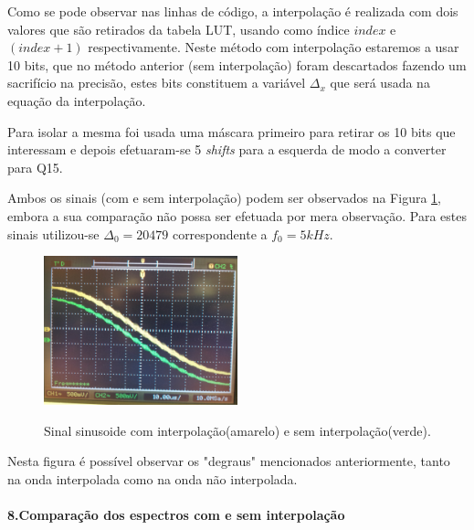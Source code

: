 \documentclass[11pt]{article}
\numberwithin{equation}{section}
\begin{document}
Como se pode observar nas linhas de código, a interpolação é realizada com dois valores que são retirados da tabela LUT, usando como índice $\textit{index}$ \hspace{0,1 mm} e $(\textit{index}+1)$ respectivamente. Neste método com interpolação estaremos a usar 10 bits, que no método anterior (sem interpolação) foram descartados fazendo um sacrifício na precisão,  estes bits constituem a variável $ \Delta_{x} $ que será usada na equação da interpolação.

Para isolar a mesma foi usada uma máscara primeiro para retirar os 10 bits que interessam e depois efetuaram-se 5 \textit{shifts} para a esquerda de modo a converter para Q15.

Ambos os sinais (com e sem interpolação) podem ser observados na Figura \ref{fig:interp}, embora a sua comparação não possa ser efetuada por mera observação. Para estes sinais utilizou-se $\Delta_0=20479$ correspondente a $f_0=5kHz$.
\begin{figure}[H]
	\centering
	\includegraphics[width=0.5\textwidth]{./P1_interp}~\\
	\caption{Sinal sinusoide com interpolação(amarelo) e sem interpolação(verde).}
	\label{fig:interp}
\end{figure} 
Nesta figura é possível observar os "degraus" mencionados anteriormente, tanto na onda interpolada como na onda não interpolada.

\paragraph{8.Comparação dos espectros com e sem interpolação} \hspace{0pt}
\end{document}
